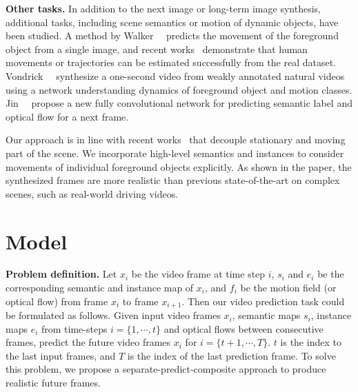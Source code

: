 \documentclass[10pt,twocolumn,letterpaper]{article}
\begin{document}
\vspace{2mm}
\noindent\textbf{Other tasks.}
In addition to the next image or long-term image synthesis, additional tasks, including scene semantics or motion of dynamic objects, have been studied. A method by Walker~\etal~\cite{Walker2016} predicts the movement of the foreground object from a single image, and recent works~\cite{Alahi2016, Bhattacharyya2018, Gupta2018, kitani2012activity, Ma2019, Yagi2018, Djuric2018, Sadeghian2018} demonstrate that human movements or trajectories can be estimated successfully from the real dataset. Vondrick~\etal~\cite{Vondrick2016} synthesize a one-second video from weakly annotated natural videos using a network understanding dynamics of foreground object and motion classes. Jin~\etal~\cite{jin2017predicting} propose a new fully convolutional network for predicting semantic label and optical flow for a next frame. 

Our approach is in line with recent works~\cite{denton2017unsupervised, villegas17mcnet, luo2017unsupervised, Qi2019} that decouple stationary and moving part of the scene. We incorporate high-level semantics and instances to consider movements of individual foreground objects explicitly. As shown in the paper, the synthesized frames are more realistic than previous state-of-the-art on complex scenes, such as real-world driving videos.


\section{Model}
\noindent\textbf{Problem definition.}
Let $x_{i}$ be the video frame at time step $i$, $s_{i}$ and $e_{i}$ be the corresponding semantic and instance map of $x_{i}$, and $f_{i}$ be the motion field (or optical flow) from frame $x_{i}$ to frame $x_{i+1}$. Then our video prediction task could be formulated as follows. Given input video frames $x_{i}$, semantic maps $s_{i}$, instance maps $e_{i}$ from time-steps $i=\{1,\cdots,t\}$ and optical flows between consecutive frames, predict the future video frames $x_{i}$ for $i=\{t+1,\cdots,T\}$. $t$ is the index to the last input frames, and $T$ is the index of the last prediction frame. To solve this problem, we propose a separate-predict-composite approach to produce realistic future frames. 
\end{document}
